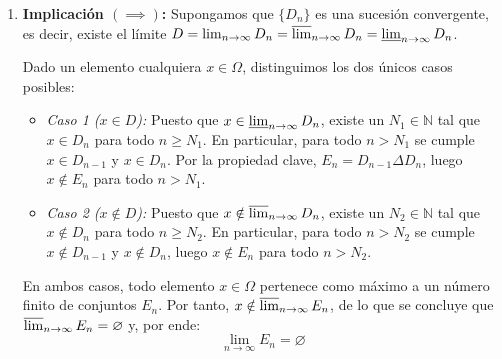 \begin{problema}
\begin{enumerate}
    \item \textbf{Implicación $(\implies)$:} Supongamos que $\{D_n\}$ es una sucesión convergente, es decir, existe el límite $D = \lim_{n \to \infty} D_n = \varlimsup_{n \to \infty} D_n = \varliminf_{n \to \infty} D_n$.
    
    Dado un elemento cualquiera $x \in \Omega$, distinguimos los dos únicos casos posibles:
    \begin{itemize}
        \item \textit{Caso 1 ($x \in D$):} Puesto que $x \in \varliminf_{n \to \infty} D_n$, existe un $N_1 \in \mathbb{N}$ tal que $x \in D_n$ para todo $n \ge N_1$. En particular, para todo $n > N_1$ se cumple $x \in D_{n-1}$ y $x \in D_n$. Por la propiedad clave, $E_n = D_{n-1} \Delta D_n$, luego $x \notin E_n$ para todo $n > N_1$.
        \item \textit{Caso 2 ($x \notin D$):} Puesto que $x \notin \varlimsup_{n \to \infty} D_n$, existe un $N_2 \in \mathbb{N}$ tal que $x \notin D_n$ para todo $n \ge N_2$. En particular, para todo $n > N_2$ se cumple $x \notin D_{n-1}$ y $x \notin D_n$, luego $x \notin E_n$ para todo $n > N_2$.
    \end{itemize}
    En ambos casos, todo elemento $x \in \Omega$ pertenece como máximo a un número finito de conjuntos $E_n$. Por tanto, $x \notin \varlimsup_{n \to \infty} E_n$, de lo que se concluye que $\varlimsup_{n \to \infty} E_n = \varnothing$ y, por ende:
    \[
        \lim_{n \to \infty} E_n = \varnothing
    \]
\end{enumerate}
\end{problema}

